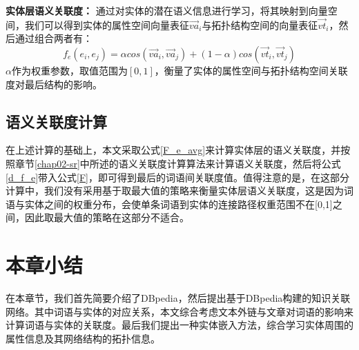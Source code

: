 \textbf{实体层语义关联度：}
通过对实体的潜在语义信息进行学习，将其映射到向量空间，我们可以得到实体的属性空间向量表征$\vec {va}_i$与拓扑结构空间的向量表征$\vec {vt}_i$，然后通过组合两者有：
\begin{equation}
    \label{d_f_e}
    f_e(e_i, e_j) = \alpha cos({\vec {va}_i, \vec {va}_j}) 
    + (1-\alpha)cos(\vec {vt}_i,\vec {vt}_j)
\end{equation}
\noindent $\alpha$作为权重参数，取值范围为$[0,1]$，衡量了实体的属性空间与拓扑结构空间关联度对最后结构的影响。

\subsection{语义关联度计算}
在上述计算的基础上，本文采取公式\ref{F_e_avg}来计算实体层的语义关联度，并按照章节\ref{chap02-sr}中所述的语义关联度计算算法来计算语义关联度，然后将公式\ref{d_f_e}带入公式\ref{F}，即可得到最后的词语间关联度值。值得注意的是，在这部分计算中，我们没有采用基于取最大值的策略来衡量实体层语义关联度，这是因为词语与实体之间的权重分布，会使单条词语到实体的连接路径权重范围不在[0,1]之间，因此取最大值的策略在这部分不适合。

\section{本章小结}

在本章节，我们首先简要介绍了DBpedia，然后提出基于DBpedia构建的知识关联网络。其中词语与实体的对应关系，本文综合考虑文本外链与文章对词语的影响来计算词语与实体的关联度。最后我们提出一种实体嵌入方法，综合学习实体周围的属性信息及其网络结构的拓扑信息。
